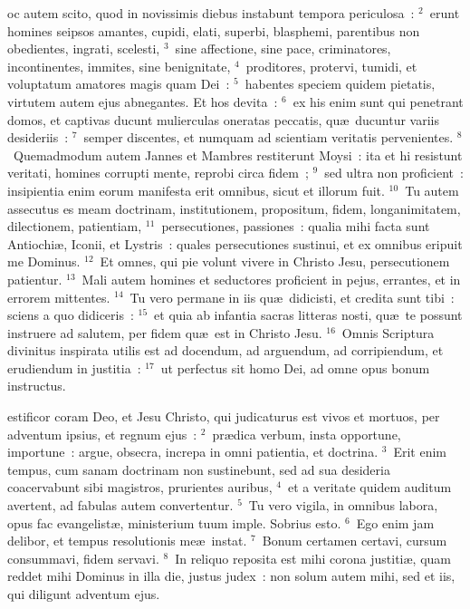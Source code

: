 \bchapter
{}oc autem scito, quod in novissimis diebus instabunt tempora periculosa~:
${}^{2}$~erunt homines seipsos amantes, cupidi, elati, superbi, blasphemi, parentibus non obedientes, ingrati, scelesti,
${}^{3}$~sine affectione, sine pace, criminatores, incontinentes, immites, sine benignitate,
${}^{4}$~proditores, protervi, tumidi, et voluptatum amatores magis quam Dei~:
${}^{5}$~habentes speciem quidem pietatis, virtutem autem ejus abnegantes. Et hos devita~:
${}^{6}$~ex his enim sunt qui penetrant domos, et captivas ducunt mulierculas oneratas peccatis, qu\ae\ ducuntur variis desideriis~:
${}^{7}$~semper discentes, et numquam ad scientiam veritatis pervenientes.
${}^{8}$~Quemadmodum autem Jannes et Mambres restiterunt Moysi~: ita et hi resistunt veritati, homines corrupti mente, reprobi circa fidem~;
${}^{9}$~sed ultra non proficient~: insipientia enim eorum manifesta erit omnibus, sicut et illorum fuit.
${}^{10}$~Tu autem assecutus es meam doctrinam, institutionem, propositum, fidem, longanimitatem, dilectionem, patientiam,
${}^{11}$~persecutiones, passiones~: qualia mihi facta sunt Antiochi\ae , Iconii, et Lystris~: quales persecutiones sustinui, et ex omnibus eripuit me Dominus.
${}^{12}$~Et omnes, qui pie volunt vivere in Christo Jesu, persecutionem patientur.
${}^{13}$~Mali autem homines et seductores proficient in pejus, errantes, et in errorem mittentes.
${}^{14}$~Tu vero permane in iis qu\ae\ didicisti, et credita sunt tibi~: sciens a quo didiceris~:
${}^{15}$~et quia ab infantia sacras litteras nosti, qu\ae\ te possunt instruere ad salutem, per fidem qu\ae\ est in Christo Jesu.
${}^{16}$~Omnis Scriptura divinitus inspirata utilis est ad docendum, ad arguendum, ad corripiendum, et erudiendum in justitia~:
${}^{17}$~ut perfectus sit homo Dei, ad omne opus bonum instructus.

\bchapter
{}estificor coram Deo, et Jesu Christo, qui judicaturus est vivos et mortuos, per adventum ipsius, et regnum ejus~:
${}^{2}$~pr\ae dica verbum, insta opportune, importune~: argue, obsecra, increpa in omni patientia, et doctrina.
${}^{3}$~Erit enim tempus, cum sanam doctrinam non sustinebunt, sed ad sua desideria coacervabunt sibi magistros, prurientes auribus,
${}^{4}$~et a veritate quidem auditum avertent, ad fabulas autem convertentur.
${}^{5}$~Tu vero vigila, in omnibus labora, opus fac evangelist\ae , ministerium tuum imple. Sobrius esto.
${}^{6}$~Ego enim jam delibor, et tempus resolutionis me\ae\ instat.
${}^{7}$~Bonum certamen certavi, cursum consummavi, fidem servavi.
${}^{8}$~In reliquo reposita est mihi corona justiti\ae , quam reddet mihi Dominus in illa die, justus judex~: non solum autem mihi, sed et iis, qui diligunt adventum ejus.

